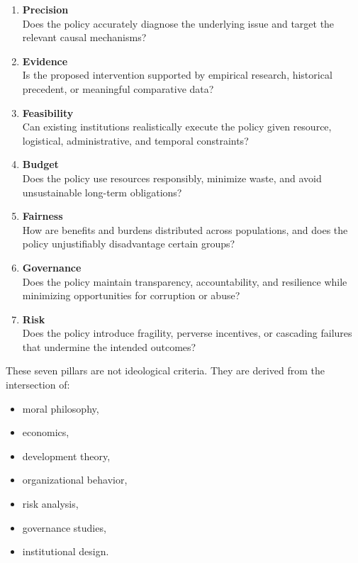 \documentclass[12pt]{article}
\begin{document}
\begin{enumerate}
    \item \textbf{Precision}\\
    Does the policy accurately diagnose the underlying issue and target the relevant causal mechanisms?

    \item \textbf{Evidence}\\
    Is the proposed intervention supported by empirical research, historical precedent, or meaningful comparative data?

    \item \textbf{Feasibility}\\
    Can existing institutions realistically execute the policy given resource, logistical, administrative, and temporal
    constraints?

    \item \textbf{Budget}\\
    Does the policy use resources responsibly, minimize waste, and avoid unsustainable long-term obligations?

    \item \textbf{Fairness}\\
    How are benefits and burdens distributed across populations, and does the policy unjustifiably disadvantage certain
    groups?

    \item \textbf{Governance}\\
    Does the policy maintain transparency, accountability, and resilience while minimizing opportunities for corruption or
    abuse?

    \item \textbf{Risk}\\
    Does the policy introduce fragility, perverse incentives, or cascading failures that undermine the intended outcomes?
\end{enumerate}

These seven pillars are not ideological criteria. They are derived from the intersection of:

\begin{itemize}
    \item moral philosophy,
    \item economics,
    \item development theory,
    \item organizational behavior,
    \item risk analysis,
    \item governance studies,
    \item institutional design.
\end{itemize}
\end{document}
